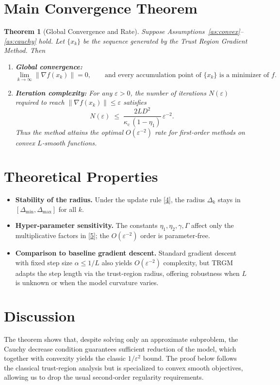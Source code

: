 \documentclass{article}
\newtheorem{theorem}{Theorem}
\newcommand{\norm}[1]{\left\lVert#1\right\rVert}
\begin{document}
\section*{Main Convergence Theorem}
\begin{theorem}[Global Convergence and Rate]\label{thm:main}
Suppose Assumptions~\ref{as:convex}–\ref{as:cauchy} hold.
Let $\{x_k\}$ be the sequence generated by the Trust Region Gradient Method.
Then
\begin{enumerate}[label=(\roman*)]
\item \textbf{Global convergence:}
\[
\lim_{k\to\infty}\norm{\nabla f(x_k)}=0,
\qquad
\text{and every accumulation point of }\{x_k\}\text{ is a minimizer of }f.
\]
\item \textbf{Iteration complexity:}
For any $\varepsilon>0$, the number of iterations $N(\varepsilon)$ required to
reach $\norm{\nabla f(x_k)}\le\varepsilon$ satisfies
\[
N(\varepsilon)\;\le\;
\frac{2L D^{2}}{\kappa_{\mathrm{c}}\,(1-\eta_{1})}\,\varepsilon^{-2}.
\tag{5}
\]
Thus the method attains the optimal $O(\varepsilon^{-2})$ rate for first‑order
methods on convex $L$‑smooth functions.
\end{enumerate}
\end{theorem}

\section*{Theoretical Properties}
\begin{itemize}
\item \textbf{Stability of the radius.} Under the update rule \eqref{4},
the radius $\Delta_k$ stays in $[\Delta_{\min},\Delta_{\max}]$ for all $k$.
\item \textbf{Hyper‑parameter sensitivity.}
The constants $\eta_{1},\eta_{2},\gamma,\Gamma$ affect only the
multiplicative factors in \eqref{5}; the $O(\varepsilon^{-2})$ order is
parameter‑free.
\item \textbf{Comparison to baseline gradient descent.}
Standard gradient descent with fixed step size $\alpha\le 1/L$ also yields
$O(\varepsilon^{-2})$ complexity, but TRGM adapts the step length via the
trust‑region radius, offering robustness when $L$ is unknown or when the
model curvature varies.
\end{itemize}

\section*{Discussion}
The theorem shows that, despite solving only an approximate subproblem,
the Cauchy decrease condition guarantees sufficient reduction of the model,
which together with convexity yields the classic $1/\varepsilon^{2}$ bound.
The proof below follows the classical trust‑region analysis but is specialized
to convex smooth objectives, allowing us to drop the usual second‑order
regularity requirements.
\end{document}
